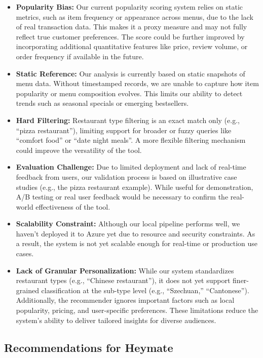 \documentclass[
  11pt,
  a4paper,
  DIV=11,
  numbers=noendperiod]{scrartcl}
\providecommand{\tightlist}{%
  \setlength{\itemsep}{0pt}\setlength{\parskip}{0pt}}\usepackage{longtable,booktabs,array}
\begin{document}
\begin{itemize}
\tightlist
\item
  \textbf{Popularity Bias:} Our current popularity scoring system relies
  on static metrics, such as item frequency or appearance across menus,
  due to the lack of real transaction data. This makes it a proxy
  measure and may not fully reflect true customer preferences. The score
  could be further improved by incorporating additional quantitative
  features like price, review volume, or order frequency if available in
  the future.
\item
  \textbf{Static Reference:} Our analysis is currently based on static
  snapshots of menu data. Without timestamped records, we are unable to
  capture how item popularity or menu composition evolves. This limits
  our ability to detect trends such as seasonal specials or emerging
  bestsellers.
\item
  \textbf{Hard Filtering:} Restaurant type filtering is an exact match
  only (e.g., ``pizza restaurant''), limiting support for broader or
  fuzzy queries like ``comfort food'' or ``date night meals''. A more
  flexible filtering mechanism could improve the versatility of the
  tool.
\item
  \textbf{Evaluation Challenge:} Due to limited deployment and lack of
  real-time feedback from users, our validation process is based on
  illustrative case studies (e.g., the pizza restaurant example). While
  useful for demonstration, A/B testing or real user feedback would be
  necessary to confirm the real-world effectiveness of the tool.
\item
  \textbf{Scalability Constraint:} Although our local pipeline performs
  well, we haven't deployed it to Azure yet due to resource and security
  constraints. As a result, the system is not yet scalable enough for
  real-time or production use cases.
\item
  \textbf{Lack of Granular Personalization:} While our system
  standardizes restaurant types (e.g., ``Chinese restaurant''), it does
  not yet support finer-grained classification at the sub-type level
  (e.g., ``Szechuan,'' ``Cantonese''). Additionally, the recommender
  ignores important factors such as local popularity, pricing, and
  user-specific preferences. These limitations reduce the system's
  ability to deliver tailored insights for diverse audiences.
\end{itemize}

\subsection{Recommendations for
Heymate}\label{recommendations-for-heymate}
\end{document}
